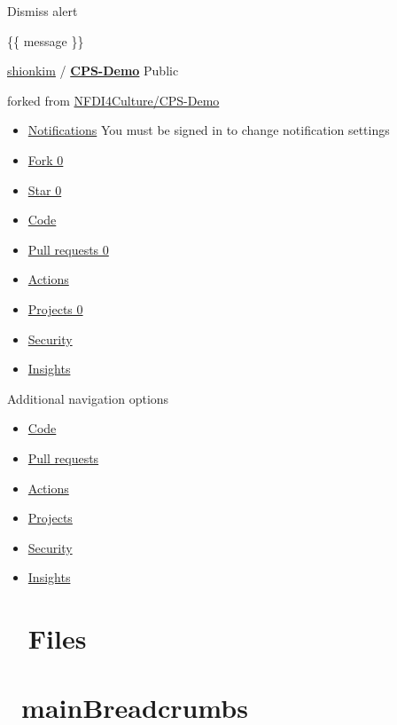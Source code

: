 \documentclass[
  letterpaper,
]{book}
\begin{document}
Dismiss alert

\{\{ message \}\}

\href{./shionkim}{shionkim} /
\textbf{\href{./shionkim/CPS-Demo}{CPS-Demo}} Public

forked from \href{./NFDI4Culture/CPS-Demo}{NFDI4Culture/CPS-Demo}

\begin{itemize}
\item
  \href{./login?return_to=\%2Fshionkim\%2FCPS-Demo}{Notifications} You
  must be signed in to change notification settings
\item
  \href{./login?return_to=\%2Fshionkim\%2FCPS-Demo}{Fork 0}
\item
  \href{./login?return_to=\%2Fshionkim\%2FCPS-Demo}{Star 0}
\item
  \href{./shionkim/CPS-Demo}{Code}
\item
  \href{./shionkim/CPS-Demo/pulls}{Pull requests 0}
\item
  \href{./shionkim/CPS-Demo/actions}{Actions}
\item
  \href{./shionkim/CPS-Demo/projects}{Projects 0}
\item
  \href{./shionkim/CPS-Demo/security}{Security}
\item
  \href{./shionkim/CPS-Demo/pulse}{Insights}
\end{itemize}

Additional navigation options

\begin{itemize}
\item
  \href{./shionkim/CPS-Demo}{Code}
\item
  \href{./shionkim/CPS-Demo/pulls}{Pull requests}
\item
  \href{./shionkim/CPS-Demo/actions}{Actions}
\item
  \href{./shionkim/CPS-Demo/projects}{Projects}
\item
  \href{./shionkim/CPS-Demo/security}{Security}
\item
  \href{./shionkim/CPS-Demo/pulse}{Insights}

  \section{Files}\label{files}
\end{itemize}

\section{~mainBreadcrumbs}\label{mainbreadcrumbs}
\end{document}
